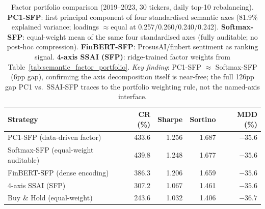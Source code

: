 \begin{table}[htbp]
\centering
\caption{%
  Factor portfolio comparison (2019--2023, 30 tickers, daily top-10 rebalancing).
  \textbf{PC1-SFP}: first principal component of four standardised semantic axes (81.9\% explained
  variance; loadings $\approx$equal at 0.257/0.260/0.240/0.242).
  \textbf{Softmax-SFP}: equal-weight mean of the same four standardised axes (fully auditable;
  no post-hoc compression).
  \textbf{FinBERT-SFP}: ProsusAI/finbert sentiment as ranking signal.
  \textbf{4-axis SSAI (SFP)}: ridge-trained factor weights from Table~\ref{tab:semantic_factor_portfolio}.
  \emph{Key finding}: PC1-SFP $\approx$ Softmax-SFP (6pp gap), confirming the axis decomposition
  itself is near-free; the full 126pp gap PC1 vs.\ SSAI-SFP traces to the portfolio weighting rule, not the named-axis interface.
}
\label{tab:factor_comparison}
\begin{tabular}{lrrrr}
\toprule
\textbf{Strategy} & \textbf{CR (\%)} & \textbf{Sharpe} & \textbf{Sortino} & \textbf{MDD (\%)} \\
\midrule
PC1-SFP (data-driven factor)         & 433.6 & 1.256 & 1.687 & $-35.6$ \\
Softmax-SFP (equal-weight auditable) & 439.8 & 1.248 & 1.677 & $-35.6$ \\
FinBERT-SFP (dense encoding)         & 386.3 & 1.206 & 1.659 & $-35.6$ \\
4-axis SSAI (SFP)                    & 307.2 & 1.067 & 1.461 & $-35.6$ \\
Buy \& Hold (equal-weight)           & 243.6 & 1.032 & 1.406 & $-36.7$ \\
\bottomrule
\end{tabular}
\end{table}
